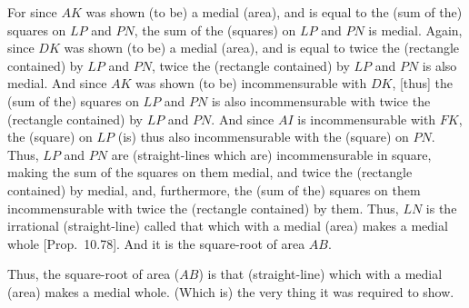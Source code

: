 \begin{Parallel}{}{}
{For since $AK$ was shown (to be) a medial (area), and is equal to the
(sum of the) squares on $LP$ and $PN$, the sum of the (squares) on
$LP$ and $PN$ is medial. Again, since $DK$ was shown (to
be) a medial (area), and is equal to twice the (rectangle contained)
by $LP$ and $PN$, twice the (rectangle contained) by $LP$ and
$PN$ is also medial. And since $AK$ was shown (to be) incommensurable
with $DK$, [thus] the (sum of the) squares on $LP$ and $PN$ is also
incommensurable with twice the (rectangle contained) by $LP$ and $PN$.
And since $AI$ is incommensurable with $FK$, the (square) on
$LP$ (is) thus also incommensurable with the (square) on $PN$. Thus, $LP$ and $PN$
are (straight-lines which are) incommensurable in square, making the sum of the squares on them
medial, and twice the (rectangle contained) by  medial, and, furthermore,
the (sum of the) squares on them incommensurable with twice the
(rectangle contained) by them. Thus, $LN$ is the irrational (straight-line) called  that  which with a medial (area) makes a medial whole [Prop.~10.78]. And it is the square-root of area $AB$.

Thus, the square-root of area ($AB$) is that (straight-line) which with a medial (area) makes a medial whole. (Which is) the very thing it was required to show.\\}
\end{Parallel}

